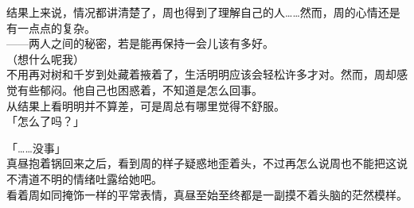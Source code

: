 结果上来说，情况都讲清楚了，周也得到了理解自己的人……然而，周的心情还是有一点点的复杂。\\

——两人之间的秘密，若是能再保持一会儿该有多好。\\

（想什么呢我）\\

不用再对树和千岁到处藏着掖着了，生活明明应该会轻松许多才对。然而，周却感觉有些郁闷。他自己也困惑着，不知道是怎么回事。\\

从结果上看明明并不算差，可是周总有哪里觉得不舒服。\\

「怎么了吗？」

「……没事」\\

真昼抱着锅回来之后，看到周的样子疑惑地歪着头，不过再怎么说周也不能把这说不清道不明的情绪吐露给她吧。\\

看着周如同掩饰一样的平常表情，真昼至始至终都是一副摸不着头脑的茫然模样。
